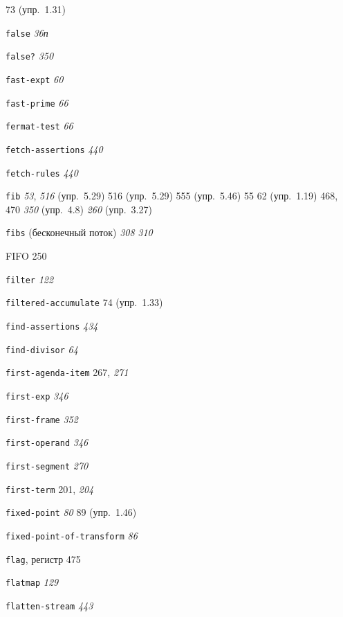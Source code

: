 \begin{theindex}
   73 (упр.~1.31)
\item {\texttt{false}} {\it 36}{\it п}
\item {\texttt{false?}} {\it 350}
\item {\texttt{fast-expt}} {\it 60}
\item {\texttt{fast-prime}} {\it 66}
\item {\texttt{fermat-test}} {\it 66}
\item {\texttt{fetch-assertions}} {\it 440}
\item {\texttt{fetch-rules}} {\it 440}
\item {\texttt{fib}}
   {\it 53}, {\it 516} (упр.~5.29)
   516 (упр.~5.29)
   555 (упр.~5.46)
   55
   62 (упр.~1.19)
   468, 470
   {\it 350} (упр.~4.8)
   {\it 260} (упр.~3.27)
\item {\texttt{fibs} (бесконечный поток)} {\it 308}
   {\it 310}
\item {FIFO} 250
\item {\texttt{filter}} {\it 122}
\item {\texttt{filtered-accumulate}} 74 (упр.~1.33)
\item {\texttt{find-assertions}} {\it 434}
\item {\texttt{find-divisor}} {\it 64}
\item {\texttt{first-agenda-item}} 267, {\it 271}
\item {\texttt{first-exp}} {\it 346}
\item {\texttt{first-frame}} {\it 352}
\item {\texttt{first-operand}} {\it 346}
\item {\texttt{first-segment}} {\it 270}
\item {\texttt{first-term}} 201, {\it 204}
\item {\texttt{fixed-point}} {\it 80}
   89 (упр.~1.46)
\item {\texttt{fixed-point-of-transform}} {\it 86}
\item {\texttt{flag}, регистр} 475
\item {\texttt{flatmap}} {\it 129}
\item {\texttt{flatten-stream}} {\it 443}

\end{theindex}
